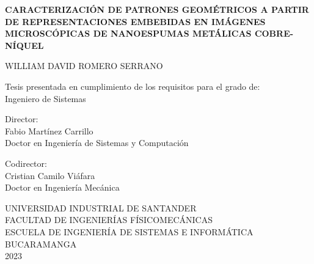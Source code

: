 \begin{center}
{\bfseries
CARACTERIZACIÓN DE PATRONES GEOMÉTRICOS A PARTIR DE REPRESENTACIONES EMBEBIDAS EN IMÁGENES MICROSCÓPICAS DE NANOESPUMAS METÁLICAS COBRE-NÍQUEL\\\vspace{2cm}

WILLIAM DAVID ROMERO SERRANO\\
\vspace{1cm}

Tesis presentada en cumplimiento de los requisitos para el grado de:\\
Ingeniero de Sistemas\\\vspace{1cm}

Director:\\
Fabio Martínez Carrillo\\
Doctor en Ingeniería de Sistemas y Computación \vspace{1cm}

Codirector:\\
Cristian Camilo Viáfara\\
Doctor en Ingeniería Mecánica\vspace{2cm}

UNIVERSIDAD INDUSTRIAL DE SANTANDER\\
FACULTAD DE INGENIERÍAS FÍSICOMECÁNICAS\\
ESCUELA DE INGENIERÍA DE SISTEMAS E INFORMÁTICA\\
BUCARAMANGA\\
2023\\
}
\end{center}


